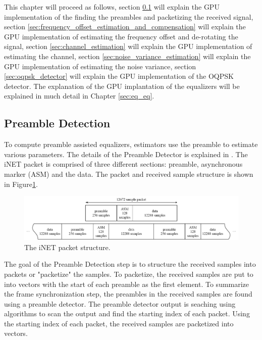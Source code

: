This chapter will proceed as follows, 
section \ref{sec:preamble_detection} will explain the GPU implementation of the finding the preambles and packetizing the received signal,
section \ref{sec:frequency_offset_estimation_and_compensation} will explain the GPU implementation of estimating the frequency offset and de-rotating the signal,
section \ref{sec:channel_estimation} will explain the GPU implementation of estimating the channel,
section \ref{sec:noise_variance_estimation} will explain the GPU implementation of estimating the noise variance,
section \ref{sec:oqpsk_detector} will explain the GPU implementation of the OQPSK detector.
The explanation of the GPU implantation of the equalizers will be explained in much detail in Chapter \ref{sec:eq_eq}.





















\subsection{Preamble Detection}
\label{sec:preamble_detection}
To compute preamble assisted equalizers, estimators use the preamble to estimate various parameters. 
The details of the Preamble Detector is explained in \cite{preamble_detector}.
The iNET packet is comprised of three different sections: preamble, asynchronous marker (ASM) and the data. 
The packet and received sample structure is shown in Figure\ref{fig:packet}.
\begin{figure}
	\centering\includegraphics[width=\textwidth]{figures/gpu/packet.png}
	\caption{The iNET packet structure.}
	\label{fig:packet}
\end{figure}

The goal of the Preamble Detection step is to structure the received samples into packets or "packetize" the samples. 
To packetize, the received samples are put to into vectors with the start of each preamble as the first element.
To summarize the frame synchronization step, the preambles in the received samples are found using a preamble detector. The preamble detector output is seaching using algorithms to scan the output and find the starting index of each packet. 
Using the starting index of each packet, the received samples are packetized into vectors. 

